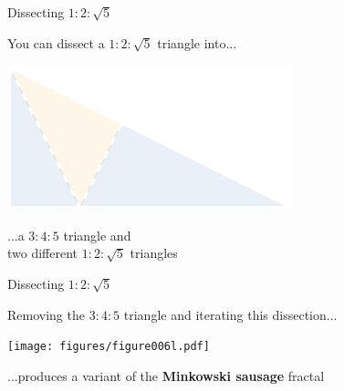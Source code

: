 \documentclass[14pt]{beamer}
\begin{document}

    \begin{frame}{Dissecting $1\!\!:\!\!2\!\!:\!\!\sqrt{5}$}
        \begin{center}
            You can dissect a $1\!\!:\!\!2\!\!:\!\!\sqrt{5}$ triangle into...

            \bigskip \bigskip

            \includegraphics[height=18ex]{figures/figure006i.pdf}

            \bigskip \bigskip

            ...a $3\!\!:\!\!4\!\!:\!\!5$ triangle and\\two different $1\!\!:\!\!2\!\!:\!\!\sqrt{5}$ triangles
        \end{center}
    \end{frame}


    \begin{frame}{Dissecting $1\!\!:\!\!2\!\!:\!\!\sqrt{5}$}
        \begin{center}
            Removing the $3\!\!:\!\!4\!\!:\!\!5$ triangle and iterating this dissection...

            \bigskip \bigskip

            \texttt{[image: figures/figure006l.pdf]}

            \bigskip \bigskip

            ...produces a variant of the \textbf{Minkowski sausage} fractal\\[4ex]
        \end{center}
    \end{frame}

\end{document}
